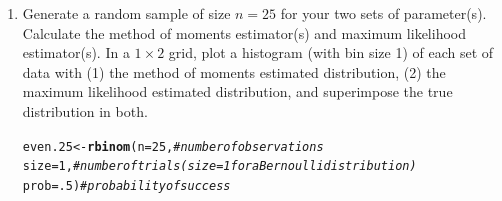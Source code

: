 \documentclass{article}\usepackage[]{graphicx}\usepackage[]{color}
\makeatletter
\newcommand{\hlnum}[1]{\textcolor[rgb]{0.686,0.059,0.569}{#1}}%
\newcommand{\hlcom}[1]{\textcolor[rgb]{0.678,0.584,0.686}{\textit{#1}}}%
\newcommand{\hlstd}[1]{\textcolor[rgb]{0.345,0.345,0.345}{#1}}%
\newcommand{\hlkwb}[1]{\textcolor[rgb]{0.69,0.353,0.396}{#1}}%
\newcommand{\hlkwc}[1]{\textcolor[rgb]{0.333,0.667,0.333}{#1}}%
\newcommand{\hlkwd}[1]{\textcolor[rgb]{0.737,0.353,0.396}{\textbf{#1}}}%
\newenvironment{kframe}{%
 \def\at@end@of@kframe{}%
 \ifinner\ifhmode%
  \def\at@end@of@kframe{\end{minipage}}%
  \begin{minipage}{\columnwidth}%
 \fi\fi%
 \def\FrameCommand##1{\hskip\@totalleftmargin \hskip-\fboxsep
 \colorbox{shadecolor}{##1}\hskip-\fboxsep
     \hskip-\linewidth \hskip-\@totalleftmargin \hskip\columnwidth}%
 \MakeFramed {\advance\hsize-\width
   \@totalleftmargin\z@ \linewidth\hsize
   \@setminipage}}%
 {\par\unskip\endMakeFramed%
 \at@end@of@kframe}
\newenvironment{knitrout}{}{} %
\makeatother
\begin{document}
\begin{enumerate}
\begin{enumerate}
  \item Generate a random sample of size $n=25$ for your two sets of parameter(s). 
  Calculate the method of moments estimator(s) and maximum likelihood estimator(s).
  In a $1 \times 2$ grid, plot a histogram (with bin size 1) of each set of data 
  with (1) the method of moments estimated distribution, (2) the maximum likelihood 
  estimated distribution, and superimpose the true distribution in both.
\begin{knitrout}
\color{fgcolor}\begin{kframe}
\begin{alltt}
\hlstd{even.25} \hlkwb{<-} \hlkwd{rbinom}\hlstd{(}\hlkwc{n}\hlstd{=}\hlnum{25}\hlstd{,}        \hlcom{#number of observations}
                  \hlkwc{size}\hlstd{=}\hlnum{1}\hlstd{,}        \hlcom{#number of trials (size=1 for a Bernoulli distribution)}
                  \hlkwc{prob}\hlstd{=}\hlnum{.5}\hlstd{)}       \hlcom{#probability of success}


\end{alltt}
\end{kframe}
\end{knitrout}
\end{enumerate}
\end{enumerate}
\end{document}
